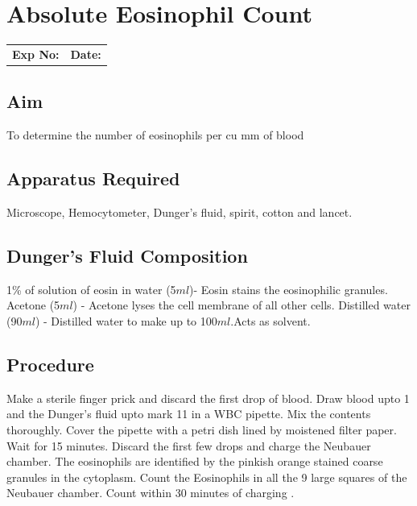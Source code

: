 \documentclass[a4paper,12pt]{book}
\begin{document}
					\chapter*{\centering Absolute Eosinophil Count}

					\begin{tabular}{p{5in} p{1in}}
						\textbf{Exp No:}  & \textbf{Date:}\\
					\end{tabular}

					\section*{Aim}

					To determine the number of eosinophils per cu mm of blood
					\section*{Apparatus Required}
					Microscope, Hemocytometer, Dunger’s fluid, spirit, cotton and lancet.
					\section*{Dunger's Fluid Composition}
					1\% of solution of eosin in water (5$ml$)- Eosin stains the eosinophilic granules.\newline
					Acetone (5$ml$) - Acetone lyses the cell membrane of all other cells.\newline
					Distilled water (90$ml$) - Distilled water to make up to 100$ml$.Acts as solvent.\newline
					\section*{Procedure}
					Make a sterile finger prick and discard the first drop of blood. Draw blood upto 1 and the Dunger’s fluid upto mark 11 in a WBC pipette. Mix the contents thoroughly. Cover the pipette with a petri dish lined by moistened filter paper. Wait for 15 minutes. Discard the first few drops and charge the Neubauer chamber. The eosinophils are identified by the pinkish orange stained coarse granules in the cytoplasm. Count the Eosinophils in all the 9 large squares of the Neubauer chamber. Count within 30 minutes of charging .
\end{document}
